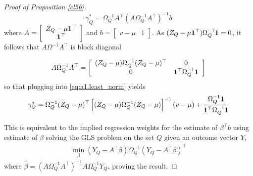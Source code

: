 \begin{proof}[Proof of Proposition \ref{cl56}]
\begin{equation}\label{eq:a1.least_norm}
 \gamma_Q^* = \Omega^{-1}_Q A^\top (A\Omega^{-1}_QA^\top)^{-1} b
\end{equation}
where $A = \left[ \begin{array}{cr} Z_Q - \mu {\bf 1}^\top\\ {\bf 1}^\top \end{array}\right]$ and $b = \left[\begin{array}{cr} v - \mu & 1 \end{array}\right]$. As $(Z_{Q} - \mu{\bf 1}^\top)\Omega_Q^{-1} {\bf 1} = 0$, it follows that $A\Omega^{-1}A^\top$ is block diagonal

\[ A\Omega_Q^{-1}A^\top = \left[\begin{array}{cc} (Z_Q - \mu)\Omega_Q^{-1} (Z_Q- \mu)^\top & 0  \\ 0 & {\bf 1}^\top \Omega^{-1}_Q{\bf 1}\end{array}\right] \]
so that plugging into \eqref{eq:a1.least_norm} yields
 \begin{equation*}
 \gamma^*_{Q} = \Omega_{Q}^{-1} (Z_{Q} - \mu)^\top\left[ (Z_Q - \mu) \Omega_{Q}^{-1} (Z_Q - \mu)\right]^{-1} (v - \mu) + \frac{\Omega^{-1}_Q {\bf 1} }{{\bf 1}^\top \Omega^{-1}_Q {\bf 1}}
 \end{equation*}

This is equivalent to the implied regression weights for the estimate of $\beta^\top b$ using estimate of $\beta$ solving the GLS problem on the set $Q$ given an outcome vector $Y$, 
\begin{align*}
    \min_{\beta} (Y_Q - A^\top \beta)\Omega_Q^{-1}(Y_Q - A^\top \beta)^\top
\end{align*}
%
where $\hat{\beta} = (A\Omega_Q^{-1}A^\top)^{-1}A\Omega_Q^{-1}Y_Q$, proving the result.

\end{proof}


